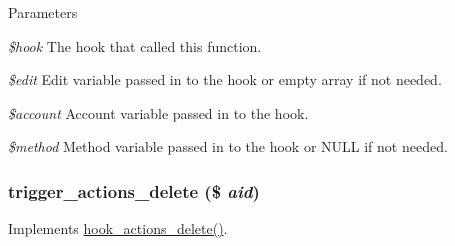 \begin{DoxyParams}{Parameters}
\item[{\em \$hook}]The hook that called this function. \item[{\em \$edit}]Edit variable passed in to the hook or empty array if not needed. \item[{\em \$account}]Account variable passed in to the hook. \item[{\em \$method}]Method variable passed in to the hook or NULL if not needed. \end{DoxyParams}
\hypertarget{trigger_8module_a904aef66799dde9fa679d9564ef905a9}{
\subsubsection[{trigger\_\-actions\_\-delete}]{\setlength{\rightskip}{0pt plus 5cm}trigger\_\-actions\_\-delete (\$ {\em aid})}}
\label{trigger_8module_a904aef66799dde9fa679d9564ef905a9}
Implements \hyperlink{group__hooks_ga21102314b21e33695c3967922b4d9efe}{hook\_\-actions\_\-delete()}.

